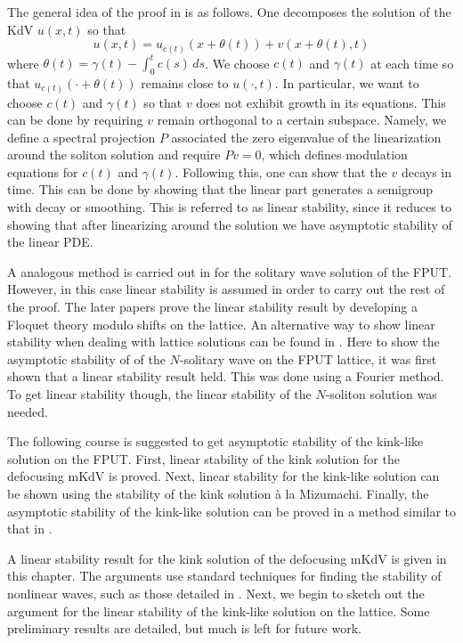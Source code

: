 The general idea of the proof in \cite{pego1994asymptotic} is as follows. One decomposes the solution of the KdV \(u(x,t)\) so that
\begin{equation}
	u(x,t)  = u_{c(t)} (x + \theta(t)) + v(x + \theta(t), t)
\end{equation}
where \(\theta(t) = \gamma(t) - \int_0^t c(s)\, ds\). We choose \(c(t)\) and \(\gamma(t)\) at each time so that \(u_{c(t)} (\cdot + \theta(t))\) remains close to \(u(\cdot, t)\). In particular, we want to choose \(c(t)\) and \(\gamma(t)\) so that \(v\) does not exhibit growth in its equations. This can be done by requiring \(v\) remain orthogonal to a certain subspace. Namely, we define a spectral projection \(P\) associated the zero eigenvalue of the linearization around the soliton solution and require \(P v = 0\), which defines modulation equations for \(c(t)\) and \(\gamma(t)\). Following this, one can show that the \(v\) decays in time. This can be done by showing that the linear part generates a semigroup with decay or smoothing. This is referred to as linear stability, since it reduces to showing that after linearizing around the solution we have asymptotic stability of the linear PDE.

A analogous method is carried out in \cite{friesecke2002solitary} for the solitary wave solution of the FPUT. However, in this case linear stability is assumed in order to carry out the rest of the proof. The later papers \cite{friesecke2003solitary,friesecke2004solitary} prove the linear stability result by developing a Floquet theory modulo shifts on the lattice. An alternative way to show linear stability when dealing with lattice solutions can be found in \cite{mizumachi2013asymptotic}. Here to show the asymptotic stability of of the \(N\)-solitary wave on the FPUT lattice, it was first shown that a linear stability result held. This was done using a Fourier method. To get linear stability though, the linear stability of the \(N\)-soliton solution was needed.

The following course is suggested to get asymptotic stability of the kink-like solution on the FPUT. First, linear stability of the kink solution for the defocusing mKdV is proved. Next, linear stability for the kink-like solution can be shown using the stability of the kink solution \`a la Mizumachi. Finally, the asymptotic stability of the kink-like solution can be proved in a method similar to that in \cite{friesecke2002solitary}.

A linear stability result for the kink solution of the defocusing mKdV is given in this chapter. The arguments use standard techniques for finding the stability of nonlinear waves, such as those detailed in \cite{kapitula2013spectral}. Next, we begin to sketch out the argument for the linear stability of the kink-like solution on the lattice. Some preliminary results are detailed, but much is left for future work.
